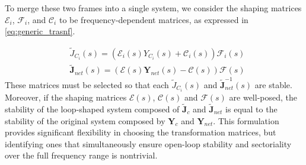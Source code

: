 To merge these two frames into a single system, we consider the shaping matrices $\mathcal{E}_i$, $\mathcal{F}_i$, and $\mathcal{C}_i$ to be frequency-dependent matrices, as expressed in \eqref{eq:generic_trasnf}.

\begin{equation}
\begin{aligned}
    &\tilde{J}_{C_i}(s) =(\mathcal{E}_i(s)Y_{C_i}(s)+\mathcal{C}_i(s))\mathcal{F}_i(s) \\
    &\tilde{\mathbf{J}}_{net}(s) =(\boldsymbol{\mathcal{E}}(s)\mathbf{Y}_{net}(s)-\boldsymbol{\mathcal{C}}(s))\boldsymbol{\mathcal{F}}(s)
    \label{eq:generic_trasnf}
\end{aligned}
\end{equation}
These matrices must be selected so that each $\tilde{J}_{C_i}(s)$ and $\tilde{\mathbf{J}}^{-1}_{net}(s)$ are stable.
Moreover, if the shaping matrices $\boldsymbol{\mathcal{E}}(s)$, $\boldsymbol{\mathcal{C}}(s)$ and $\boldsymbol{\mathcal{F}}(s)$ are well-posed, the stability of the loop-shaped system composed of $\tilde{\mathbf{J}}_{c}$ and $\tilde{\mathbf{J}}_{net}$ is equal to the stability of the original system composed by $\mathbf{Y}_{c}$ and $\mathbf{Y}_{net}$. 
This formulation provides significant flexibility in choosing the transformation matrices, but identifying ones that simultaneously ensure open-loop stability and sectoriality over the full frequency range is nontrivial.


